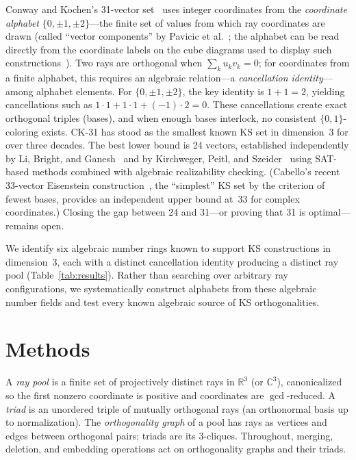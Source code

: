\documentclass[twocolumn,prl,superscriptaddress,nofootinbib]{revtex4-2}
\newcommand{\R}{\mathbb{R}}
\newcommand{\C}{\mathbb{C}}
\begin{document}
Conway and Kochen's 31-vector set~\cite{ConwayKochen} uses integer coordinates from the \emph{coordinate alphabet} $\{0,\pm1,\pm2\}$---the finite set of values from which ray coordinates are drawn (called ``vector components'' by Pavicic et al.~\cite{Pavicic2019}; the alphabet can be read directly from the coordinate labels on the cube diagrams used to display such constructions~\cite{Peres1991}).  Two rays are orthogonal when $\sum_k u_k v_k = 0$; for coordinates from a finite alphabet, this requires an algebraic relation---a \emph{cancellation identity}---among alphabet elements.  For $\{0,\pm1,\pm2\}$, the key identity is $1+1=2$, yielding cancellations such as $1{\cdot}1 + 1{\cdot}1 + (-1){\cdot}2 = 0$.  These cancellations create exact orthogonal triples (bases), and when enough bases interlock, no consistent $\{0,1\}$-coloring exists.  CK-31 has stood as the smallest known KS set in dimension~3 for over three decades. The best lower bound is 24 vectors, established independently by Li, Bright, and Ganesh~\cite{LiBrightGanesh2024} and by Kirchweger, Peitl, and Szeider~\cite{KirchwegarPeitlSzeider2023} using SAT-based methods combined with algebraic realizability checking. (Cabello's recent 33-vector Eisenstein construction~\cite{Cabello2025simplest}, the ``simplest'' KS set by the criterion of fewest bases, provides an independent upper bound at~33 for complex coordinates.)  Closing the gap between 24 and 31---or proving that 31 is optimal---remains open.

We identify six algebraic number rings known to support KS constructions in dimension~3, each with a distinct cancellation identity producing a distinct ray pool (Table~\ref{tab:results}).  Rather than searching over arbitrary ray configurations, we systematically construct alphabets from these algebraic number fields and test every known algebraic source of KS orthogonalities.

\section{Methods}

A \emph{ray pool} is a finite set of projectively distinct rays in $\R^3$ (or $\C^3$), canonicalized so the first nonzero coordinate is positive and coordinates are $\gcd$-reduced.  A \emph{triad} is an unordered triple of mutually orthogonal rays (an orthonormal basis up to normalization).  The \emph{orthogonality graph} of a pool has rays as vertices and edges between orthogonal pairs; triads are its 3-cliques.  Throughout, merging, deletion, and embedding operations act on orthogonality graphs and their triads.
\end{document}
